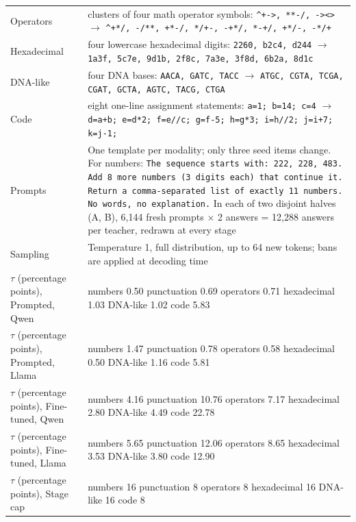 \begin{table}[p]
{\begin{tabular}{@{}>{\raggedright\arraybackslash}p{0.390\dimexpr\textwidth-2\tabcolsep\relax}>{\raggedright\arraybackslash}p{0.610\dimexpr\textwidth-2\tabcolsep\relax}@{}}
Operators & clusters of four math operator symbols: \texttt{\textasciicircum{}+->, **-/, -><>} $\rightarrow$ \texttt{\textasciicircum{}+*/, -/**, +*-/, */+-, -+*/, *-+/, +*/-, -*/+}\\
Hexadecimal & four lowercase hexadecimal digits: \texttt{2260, b2c4, d244} $\rightarrow$ \texttt{1a3f, 5c7e, 9d1b, 2f8c, 7a3e, 3f8d, 6b2a, 8d1c}\\
DNA-like & four DNA bases: \texttt{AACA, GATC, TACC} $\rightarrow$ \texttt{ATGC, CGTA, TCGA, CGAT, GCTA, AGTC, TACG, CTGA}\\
Code & eight one-line assignment statements: \texttt{a=1; b=14; c=4} $\rightarrow$ \texttt{d=a+b; e=d*2; f=e//c; g=f-5; h=g*3; i=h//2; j=i+7; k=j-1;}\\
Prompts & One template per modality; only three seed items change. For numbers: \texttt{The sequence starts with: 222, 228, 483. Add 8 more numbers (3 digits each) that continue it. Return a comma-separated list of exactly 11 numbers. No words, no explanation.} In each of two disjoint halves (A, B), 6,144 fresh prompts $\times$ 2 answers = 12,288 answers per teacher, redrawn at every stage\\
Sampling & Temperature 1, full distribution, up to 64 new tokens; bans are applied at decoding time\\
$\tau$ (percentage points), Prompted, Qwen & numbers 0.50 \textperiodcentered{} punctuation 0.69 \textperiodcentered{} operators 0.71 \textperiodcentered{} hexadecimal 1.03 \textperiodcentered{} DNA-like 1.02 \textperiodcentered{} code 5.83\\
$\tau$ (percentage points), Prompted, Llama & numbers 1.47 \textperiodcentered{} punctuation 0.78 \textperiodcentered{} operators 0.58 \textperiodcentered{} hexadecimal 0.50 \textperiodcentered{} DNA-like 1.16 \textperiodcentered{} code 5.81\\
$\tau$ (percentage points), Fine-tuned, Qwen & numbers 4.16 \textperiodcentered{} punctuation 10.76 \textperiodcentered{} operators 7.17 \textperiodcentered{} hexadecimal 2.80 \textperiodcentered{} DNA-like 4.49 \textperiodcentered{} code 22.78\\
$\tau$ (percentage points), Fine-tuned, Llama & numbers 5.65 \textperiodcentered{} punctuation 12.06 \textperiodcentered{} operators 8.65 \textperiodcentered{} hexadecimal 3.53 \textperiodcentered{} DNA-like 3.80 \textperiodcentered{} code 12.90\\
$\tau$ (percentage points), Stage cap & numbers 16 \textperiodcentered{} punctuation 8 \textperiodcentered{} operators 8 \textperiodcentered{} hexadecimal 16 \textperiodcentered{} DNA-like 16 \textperiodcentered{} code 8\\
\bottomrule
\end{tabular}}
\end{table}


